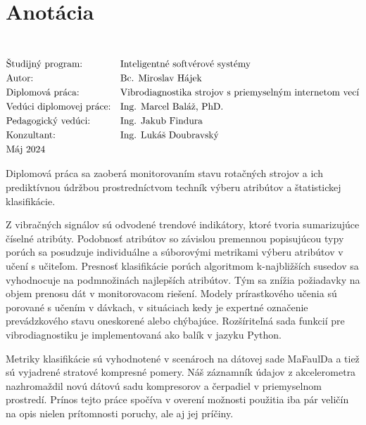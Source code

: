\section*{Anotácia}
\University \\
\uppercase{\Faculty}
\vspace{-8pt}
{\setlength{\mathindent}{0cm}
\begin{align*}
&\text{Študijný program:} && \text{\StudyProgramme} \\
&\text{Autor:} && \text{\Author} \\
&\text{\Thesis:} && \text{\Title} \\
&\text{Vedúci diplomovej práce:} && \text{\Supervisor} \\
&\text{Pedagogický vedúci:} && \text{\DepartmentalAdvisor} \\
&\text{Konzultant:} && \text{\Consultant} \\
&\text{\Date}
\end{align*}}

Diplomová práca sa zaoberá monitorovaním stavu rotačných strojov a ich prediktívnou údržbou prostredníctvom techník výberu atribútov a štatistickej klasifikácie.

Z vibračných signálov sú odvodené trendové indikátory, ktoré tvoria sumarizujúce číselné atribúty. Podobnosť atribútov so závislou premennou popisujúcou typy porúch sa posudzuje individuálne a súborovými metrikami výberu atribútov v učení s učiteľom.  Presnosť klasifikácie porúch algoritmom k-najbližších susedov sa vyhodnocuje na podmnožinách najlepších atribútov. Tým sa znížia požiadavky na objem prenosu dát v monitorovacom riešení. Modely prírastkového učenia sú porované s učením v dávkach, v situáciach kedy je expertné označenie prevádzkového stavu oneskorené alebo chýbajúce. Rozšíriteľná sada funkcií pre vibrodiagnostiku je implementovaná ako balík v jazyku Python.

Metriky klasifikácie sú vyhodnotené v scenároch na dátovej sade MaFaulDa a tiež sú vyjadrené stratové kompresné pomery. Náš záznamník údajov z akcelerometra nazhromaždil novú dátovú sadu kompresorov a čerpadiel v priemyselnom prostredí. Prínos tejto práce spočíva v overení možnosti použitia iba pár veličín na opis nielen prítomnosti poruchy, ale aj jej príčiny.
\emptypage

